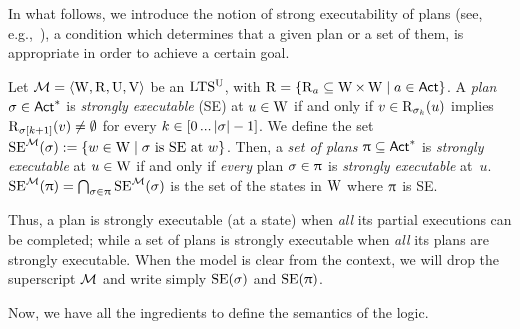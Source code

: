 \medskip

In what follows, we introduce the notion of strong executability of plans (see, e.g.,~\cite{Wang15lori,AFSVQ23report}), a condition which determines that a given plan or a set of them, is appropriate in order to achieve a certain goal.

\medskip


\begin{definition}\label{def:plans-exec}
Let $\mathcal{M}=\langle \operatorname{W}, \operatorname{R}, \operatorname{U}, \operatorname{V} \rangle$ be an $\textup{LTS$^\text{\textup{U}}$}$, with $\operatorname{R}=\{ \operatorname{R}_a\subseteq \operatorname{W} \times \operatorname{W} \mid a\in{\rm \sf Act} \}$. A \emph{plan} $\sigma \in {\rm \sf Act}^*$ is \emph{strongly executable} (SE) at $u \in \operatorname{W}$ if and only if $v \in \operatorname{R}_{\sigma_k}(u)$ implies $\operatorname{R}_{\sigma[k+1]}(v) \neq \emptyset$ for every $k \in [0 \mathop{...} |{\sigma}|-1]$.
We define the set $\operatorname{SE}^{\mathcal{M}}(\sigma):= \{ w\in\operatorname{W} \mid \sigma \mbox{ is SE at }w \}$.
Then, a \emph{set of plans} $\uppi \subseteq {\rm \sf Act}^*$ is \emph{strongly executable} at $u \in \operatorname{W}$ if and only if \emph{every} plan $\sigma \in \uppi$ is \emph{strongly executable} at~$u$.
$\operatorname{SE}^{\mathcal{M}}(\uppi) = \bigcap_{\sigma \in \uppi} \operatorname{SE}^{\mathcal{M}}(\sigma)$ is the set of the states in $\operatorname{W}$ where $\uppi$ is SE.
\end{definition}
\medskip


Thus, a plan is strongly executable (at a state) when \emph{all} its partial executions %
can be completed; while a set of plans is strongly executable when \emph{all} its plans are strongly executable. When the model is clear from the context, we will drop the superscript $\mathcal{M}$ and write simply $\operatorname{SE}(\sigma)$ and $\operatorname{SE}(\uppi)$.


Now, we have all the ingredients to define the semantics of the logic.
\medskip

